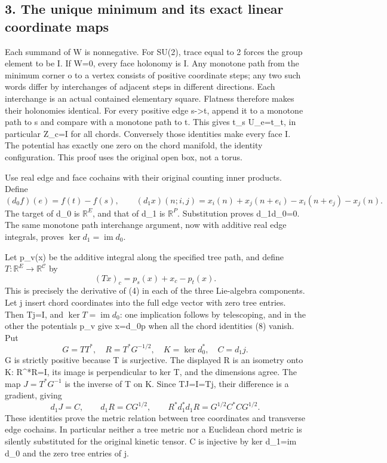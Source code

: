 \documentclass[
  11pt,
]{article}
\begin{document}
\subsection{3. The unique minimum and its exact linear coordinate
maps}\label{weak-coupling-part-1-the-unique-minimum-and-its-exact-linear-coordinate-maps}

Each summand of W is nonnegative. For SU(2), trace equal to 2 forces the
group element to be I. If W=0, every face holonomy is I. Any monotone
path from the minimum corner o to a vertex consists of positive
coordinate steps; any two such words differ by interchanges of adjacent
steps in different directions. Each interchange is an actual contained
elementary square. Flatness therefore makes their holonomies identical.
For every positive edge s-\textgreater t, append it to a monotone path
to s and compare with a monotone path to t. This gives t\_s U\_e=t\_t,
in particular Z\_c=I for all chords. Conversely those identities make
every face I. The potential has exactly one zero on the chord manifold,
the identity configuration. This proof uses the original open box, not a
torus.

Use real edge and face cochains with their original counting inner
products. Define \[
 (d_0 f)(e)=f(t)-f(s),\qquad
 (d_1 x)(n;i,j)=x_i(n)+x_j(n+e_i)-x_i(n+e_j)-x_j(n).
\tag{7}
\] The target of d\_0 is \(\mathbb R^E\), and that of d\_1 is
\(\mathbb R^P\). Substitution proves d\_1d\_0=0. The same monotone path
interchange argument, now with additive real edge integrals, proves
\(\ker d_1=\operatorname{im}d_0\).

Let p\_v(x) be the additive integral along the specified tree path, and
define \(T:\mathbb R^E\to\mathbb R^{\mathcal C}\) by \[
 (Tx)_c=p_s(x)+x_c-p_t(x).
\tag{8}
\] This is precisely the derivative of (4) in each of the three
Lie-algebra components. Let j insert chord coordinates into the full
edge vector with zero tree entries. Then Tj=I, and
\(\ker T=\operatorname{im}d_0\): one implication follows by telescoping,
and in the other the potentials p\_v give x=d\_0p when all the chord
identities (8) vanish. Put \[
 G=TT^*,\quad R=T^*G^{-1/2},\quad K=\ker d_0^*,\quad C=d_1j.
\tag{9}
\] G is strictly positive because T is surjective. The displayed R is an
isometry onto K: R\^{}*R=I, its image is perpendicular to ker T, and the
dimensions agree. The map \(J=T^*G^{-1}\) is the inverse of T on K.
Since TJ=I=Tj, their difference is a gradient, giving \[
 d_1J=C,\qquad d_1R=CG^{1/2},\qquad
 R^*d_1^*d_1R=G^{1/2}C^*CG^{1/2}.
\tag{10}
\] These identities prove the metric relation between tree coordinates
and transverse edge cochains. In particular neither a tree metric nor a
Euclidean chord metric is silently substituted for the original kinetic
tensor. C is injective by ker d\_1=im d\_0 and the zero tree entries of
j.
\end{document}
